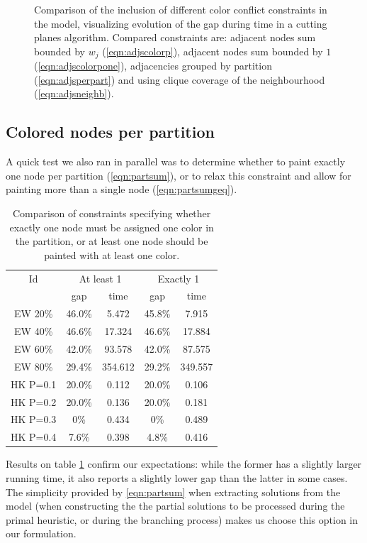 \begin{figure}
\caption{Comparison of the inclusion of different color conflict constraints in the model, visualizing evolution of the gap during time in a cutting planes algorithm. Compared constraints are: adjacent nodes sum bounded by $w_j$ (\ref{eqn:adjscolorp}), adjacent nodes sum bounded by $1$ (\ref{eqn:adjscolorpone}), adjacencies grouped by partition (\ref{eqn:adjsperpart}) and using clique coverage of the neighbourhood (\ref{eqn:adjsneighb}).}
\label{fig:models:adj}
\end{figure}

\subsection{Colored nodes per partition}

A quick test we also ran in parallel was to determine whether to paint exactly one node per partition (\ref{eqn:partsum}), or to relax this constraint and allow for painting more than a single node (\ref{eqn:partsumgeq}). 

\begin{table}
\centering

\begin{tabular}{|c|cc|cc|}
\hline
\multicolumn{1}{|c|}{Id} & \multicolumn{2}{|c|}{At least 1} & \multicolumn{2}{|c|}{Exactly 1}
\\
 & gap & time & gap & time
\\
\hline
EW 20\% & 46.0\% & 5.472 &45.8\% & 7.915
\\
EW 40\% & 46.6\% & 17.324 &46.6\% & 17.884
\\
EW 60\% & 42.0\% & 93.578 & 42.0\% & 87.575
\\
EW 80\% &29.4\% & 354.612 &29.2\% & 349.557
\\
\hline
HK P=0.1 &  20.0\% & 0.112 &  20.0\% & 0.106
\\
HK P=0.2 &  20.0\% & 0.136 &  20.0\% & 0.181
\\
HK P=0.3 &  0\% & 0.434 & 0\% & 0.489
\\
HK P=0.4 & 7.6\% & 0.398 & 4.8\% & 0.416
\\
\hline 
 \end{tabular}

\caption{Comparison of constraints specifying whether exactly one node must be assigned one color in the partition, or at least one node should be painted with at least one color.}
\label{table:models:partsum}
\end{table}

Results on table \ref{table:models:partsum} confirm our expectations: while the former has a slightly larger running time, it also reports a slightly lower gap than the latter in some cases. The simplicity provided by \ref{eqn:partsum} when extracting solutions from the model (when constructing the the partial solutions to be processed during the primal heuristic, or during the branching process) makes us choose this option in our formulation.

